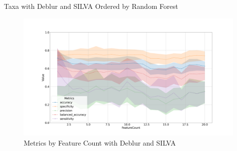 \documentclass[a4paper]{article}
\begin{document}
            \begin{table}[p]
                \centering
                \caption{Taxa with Deblur and SILVA Ordered by Random Forest}
                \label{tb:RF-every-Deblur-silva}

            \end{table}

            \begin{figure}[p]
                \centering
                \includegraphics[width=0.7 \linewidth]{figures/RandomForest/ANCOM.Deblur.silva/metrics.png}
                \caption{Metrics by Feature Count with Deblur and SILVA}
                \label{fig:RF-every-metrics-Deblur-silva}
            \end{figure}
\end{document}
